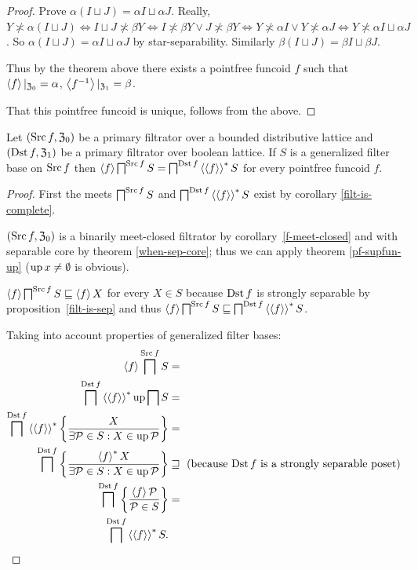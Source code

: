 \begin{proof}
Prove $\alpha(I\sqcup J)=\alpha I\sqcup\alpha J$. Really, $Y\nasymp\alpha(I\sqcup J)\Leftrightarrow I\sqcup J\nasymp\beta Y\Leftrightarrow I\nasymp\beta Y\vee J\nasymp\beta Y\Leftrightarrow Y\nasymp\alpha I\vee Y\nasymp\alpha J\Leftrightarrow Y\nasymp\alpha I\sqcup\alpha J$.
So $\alpha(I\sqcup J)=\alpha I\sqcup\alpha J$ by star-separability.
Similarly $\beta(I\sqcup J)=\beta I\sqcup\beta J$.

Thus by the theorem above there exists a pointfree funcoid $f$ such that
$\left\langle f\right\rangle|_{\mathfrak{Z}_0}=\alpha$, $\left\langle f^{-1}\right\rangle|_{\mathfrak{Z}_1}=\beta$.

That this pointfree funcoid is unique, follows from the above.\end{proof}
\begin{prop}
Let $(\operatorname{Src} f,\mathfrak{Z}_{0})$ be a primary filtrator over a bounded
distributive lattice and $(\operatorname{Dst} f,\mathfrak{Z}_{1})$ be a primary
filtrator over boolean lattice. If $S$ is a generalized filter base
on $\operatorname{Src} f$ then $\left\langle f\right\rangle\bigsqcap^{\operatorname{Src} f}S=\bigsqcap^{\operatorname{Dst} f}\left\langle \left\langle f\right\rangle\right\rangle ^{\ast}S$
for every pointfree funcoid $f$.\end{prop}
\begin{proof}
First the meets $\bigsqcap^{\operatorname{Src} f}S$ and $\bigsqcap^{\operatorname{Dst} f}\left\langle \left\langle f\right\rangle\right\rangle ^{\ast}S$
exist by corollary \ref{filt-is-complete}.

$(\operatorname{Src} f,\mathfrak{Z}_{0})$ is a binarily meet-closed filtrator by
corollary~\ref{f-meet-closed} and with separable core by theorem
\ref{when-sep-core}; thus we can apply theorem \ref{pf-supfun-up}
($\operatorname{up} x\neq\emptyset$ is obvious).

$\left\langle f\right\rangle\bigsqcap^{\operatorname{Src} f}S\sqsubseteq\left\langle f\right\rangle X$ for every $X\in S$
because $\operatorname{Dst} f$ is strongly separable by proposition~\ref{filt-is-sep} and thus
$\left\langle f\right\rangle\bigsqcap^{\operatorname{Src} f}S\sqsubseteq\bigsqcap^{\operatorname{Dst} f}\left\langle \left\langle f\right\rangle\right\rangle ^{\ast}S$.

Taking into account properties of generalized filter bases:
\begin{align*}
\left\langle f\right\rangle\bigsqcap^{\operatorname{Src} f}S & =\\
\bigsqcap^{\operatorname{Dst} f}\left\langle \left\langle f\right\rangle\right\rangle ^{\ast}\operatorname{up}\bigsqcap S & =\\
\bigsqcap^{\operatorname{Dst} f}\left\langle \left\langle f\right\rangle\right\rangle ^{\ast}\left\{ \frac{X}{\exists\mathcal{P}\in S:X\in\operatorname{up}\mathcal{P}}\right\} & =\\
\bigsqcap^{\operatorname{Dst} f}\left\{ \frac{\left\langle f\right\rangle ^{\ast}X}{\exists\mathcal{P}\in S:X\in\operatorname{up}\mathcal{P}}\right\} & \sqsupseteq\text{ (because \ensuremath{\operatorname{Dst} f} is a strongly separable poset)}\\
\bigsqcap^{\operatorname{Dst} f}\left\{ \frac{\left\langle f\right\rangle\mathcal{P}}{\mathcal{P}\in S}\right\} & =\\
\bigsqcap^{\operatorname{Dst} f}\left\langle \left\langle f\right\rangle\right\rangle ^{\ast}S.
\end{align*}
\end{proof}
